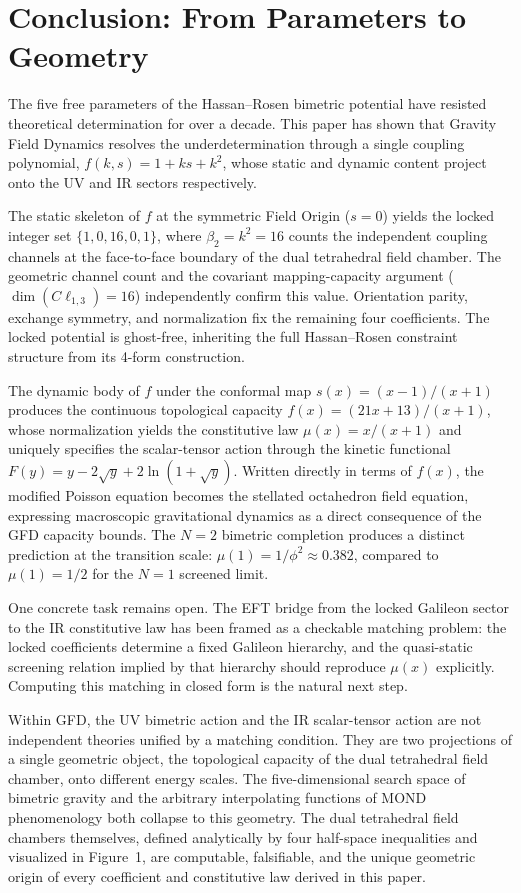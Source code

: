 \documentclass[twocolumn]{iopjournal}
\begin{document}

\section*{Conclusion: From Parameters to Geometry}

The five free parameters of the Hassan--Rosen bimetric potential have resisted theoretical determination for over a decade. This paper has shown that Gravity Field Dynamics resolves the underdetermination through a single coupling polynomial, $f(k,s) = 1 + ks + k^2$, whose static and dynamic content project onto the UV and IR sectors respectively.

The static skeleton of $f$ at the symmetric Field Origin ($s = 0$) yields the locked integer set $\{1, 0, 16, 0, 1\}$, where $\beta_2 = k^2 = 16$ counts the independent coupling channels at the face-to-face boundary of the dual tetrahedral field chamber. The geometric channel count and the covariant mapping-capacity argument ($\dim(C\ell_{1,3}) = 16$) independently confirm this value. Orientation parity, exchange symmetry, and normalization fix the remaining four coefficients. The locked potential is ghost-free, inheriting the full Hassan--Rosen constraint structure from its 4-form construction.

The dynamic body of $f$ under the conformal map $s(x) = (x-1)/(x+1)$ produces the continuous topological capacity $f(x) = (21x + 13)/(x+1)$, whose normalization yields the constitutive law $\mu(x) = x/(x+1)$ and uniquely specifies the scalar-tensor action through the kinetic functional $F(y) = y - 2\sqrt{y} + 2\ln(1 + \sqrt{y})$. Written directly in terms of $f(x)$, the modified Poisson equation becomes the stellated octahedron field equation, expressing macroscopic gravitational dynamics as a direct consequence of the GFD capacity bounds. The $N = 2$ bimetric completion produces a distinct prediction at the transition scale: $\mu(1) = 1/\phi^2 \approx 0.382$, compared to $\mu(1) = 1/2$ for the $N = 1$ screened limit.

One concrete task remains open. The EFT bridge from the locked Galileon sector to the IR constitutive law has been framed as a checkable matching problem: the locked coefficients determine a fixed Galileon hierarchy, and the quasi-static screening relation implied by that hierarchy should reproduce $\mu(x)$ explicitly. Computing this matching in closed form is the natural next step.

Within GFD, the UV bimetric action and the IR scalar-tensor action are not independent theories unified by a matching condition. They are two projections of a single geometric object, the topological capacity of the dual tetrahedral field chamber, onto different energy scales. The five-dimensional search space of bimetric gravity and the arbitrary interpolating functions of MOND phenomenology both collapse to this geometry. The dual tetrahedral field chambers themselves, defined analytically by four half-space inequalities and visualized in Figure~1, are computable, falsifiable, and the unique geometric origin of every coefficient and constitutive law derived in this paper.
\end{document}
